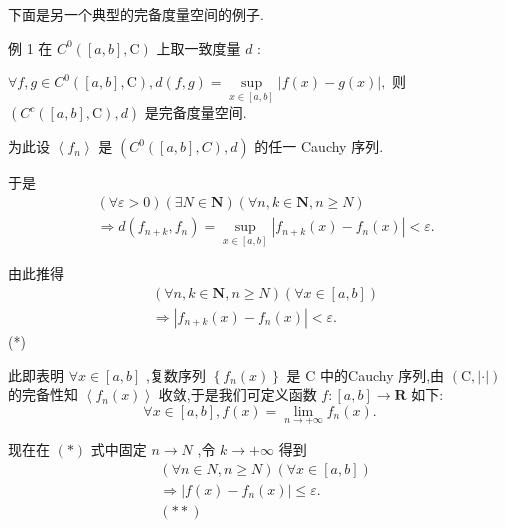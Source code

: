 下面是另一个典型的完备度量空间的例子.

例 1 在 ${C}^{0}\left( {\left\lbrack  {a,b}\right\rbrack  ,\mathrm{C}}\right)$ 上取一致度量 $d$ :

$\forall f,g \in  {C}^{0}\left( {\left\lbrack  {a,b}\right\rbrack  ,\mathrm{C}}\right) ,d\left( {f,g}\right)  = \mathop{\sup }\limits_{{x \in  \left\lbrack  {a,b}\right\rbrack  }}\left| {f\left( x\right)  - g\left( x\right) }\right| ,$ 则 $\left( {{C}^{c}\left( {\left\lbrack  {a,b}\right\rbrack  ,\mathrm{C}}\right) ,d}\right)$ 是完备度量空间.

为此设 $\left\langle  {f}_{n}\right\rangle$ 是 $\left( {{C}^{0}\left( {\left\lbrack  {a,b}\right\rbrack  ,C}\right) ,d}\right)$ 的任一 Cauchy 序列.

于是
\begin{align*}
	&\left( {\forall \varepsilon  > 0}\right) \left( {\exists N \in  \mathbf{N}}\right) \left( {\forall n,k \in  \mathbf{N},n \geq  N}\right)\\
	&\Rightarrow  d\left( {{f}_{n + k},{f}_{n}}\right)  = \mathop{\sup }\limits_{{x \in  \left\lbrack  {a,b}\right\rbrack  }}\left| {{f}_{n + k}\left( x\right)  - {f}_{n}\left( x\right) }\right|  < \varepsilon .
\end{align*}

由此推得
\begin{align*}
	&\left( {\forall n,k \in  \mathbf{N},n \geq  N}\right) \left( {\forall x \in  \left\lbrack  {a,b}\right\rbrack  }\right)\\
	&\Rightarrow  \left| {{f}_{n + k}\left( x\right)  - {f}_{n}\left( x\right) }\right|  < \varepsilon .
\end{align*}
(*)

此即表明 $\forall x \in  \left\lbrack  {a,b}\right\rbrack$ ,复数序列 $\left\{  {{f}_{n}\left( x\right) }\right\}$ 是 $\mathrm{C}$ 中的Cauchy 序列,由 $\left( {\mathrm{C},\left| \cdot \right| }\right)$ 的完备性知 $\left\langle  {{f}_{n}\left( x\right) }\right\rangle$ 收敛,于是我们可定义函数 $f : \left\lbrack  {a,b}\right\rbrack   \rightarrow  \mathbf{R}$ 如下:
$$\forall x \in  \left\lbrack  {a,b}\right\rbrack  ,f\left( x\right)  = \mathop{\lim }\limits_{{n \rightarrow   + \infty }}{f}_{n}\left( x\right) .$$

现在在 $\left( *\right)$ 式中固定 $n \rightarrow  N$ ,令 $k \rightarrow   + \infty$ 得到
\begin{align*}
	&\left( {\forall n \in  N,n \geq  N}\right) \left( {\forall x \in  \left\lbrack  {a,b}\right\rbrack  }\right)\\
	&\Rightarrow  \left| {f\left( x\right)  - {f}_{n}\left( x\right) }\right|  \leq  \varepsilon .\\
	&\left( {* * }\right)
\end{align*}

